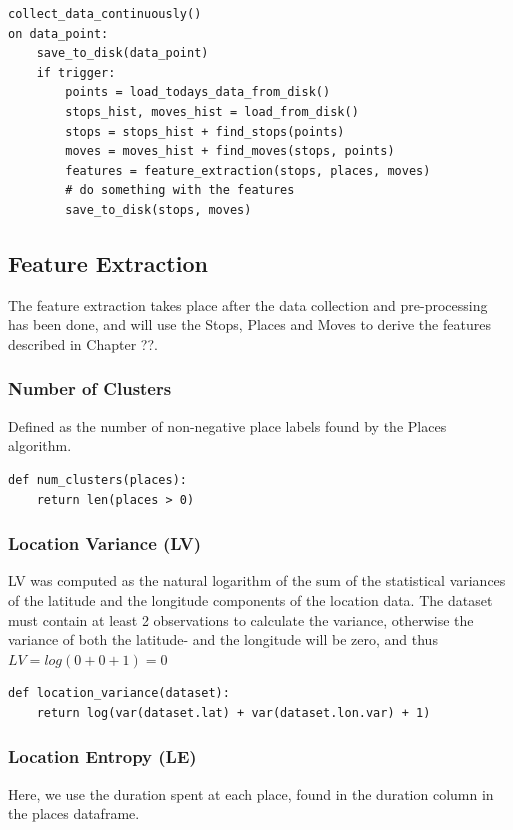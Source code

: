 \begin{verbatim}
collect_data_continuously()
on data_point:
	save_to_disk(data_point)
	if trigger:
        points = load_todays_data_from_disk()
		stops_hist, moves_hist = load_from_disk()
		stops = stops_hist + find_stops(points)
		moves = moves_hist + find_moves(stops, points)
		features = feature_extraction(stops, places, moves)
		# do something with the features
		save_to_disk(stops, moves)
\end{verbatim}

\subsection{Feature Extraction}
The feature extraction takes place after the data collection and pre-processing has been done, and will use the Stops, Places and Moves to derive the features described in Chapter ??. 

\subsubsection{Number of Clusters}
Defined as the number of non-negative place labels found by the Places algorithm.

\begin{verbatim}
def num_clusters(places):
    return len(places > 0)
\end{verbatim}

\subsubsection{Location Variance (LV)} 
LV was computed as the natural logarithm of the sum of the statistical variances of the latitude and the longitude components of the location data. The dataset must contain at least 2 observations to calculate the variance, otherwise the variance of both the latitude- and the longitude will be zero, and thus $LV = log(0 + 0 + 1)  = 0$

\begin{verbatim}
def location_variance(dataset):
    return log(var(dataset.lat) + var(dataset.lon.var) + 1)
\end{verbatim}

\subsubsection{Location Entropy (LE)} 
Here, we use the duration spent at each place, found in the duration column in the places dataframe.


